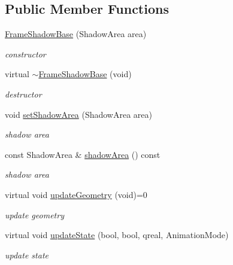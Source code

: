 \subsection*{Public Member Functions}
\begin{DoxyCompactItemize}
\item 
\mbox{\label{class_frame_shadow_base_a27aa9c8e78fe7c11d8f6f8f17751db71}} 
\hyperlink{class_frame_shadow_base_a27aa9c8e78fe7c11d8f6f8f17751db71}{Frame\+Shadow\+Base} (Shadow\+Area area)
\begin{DoxyCompactList}\small\item\em constructor \end{DoxyCompactList}\item 
\mbox{\label{class_frame_shadow_base_a8cf07c9c5d2dbc17e8bc71089f1e3518}} 
virtual \hyperlink{class_frame_shadow_base_a8cf07c9c5d2dbc17e8bc71089f1e3518}{$\sim$\+Frame\+Shadow\+Base} (void)
\begin{DoxyCompactList}\small\item\em destructor \end{DoxyCompactList}\item 
\mbox{\label{class_frame_shadow_base_a05c07a6d4f3df1a76b774fce74adc9ad}} 
void \hyperlink{class_frame_shadow_base_a05c07a6d4f3df1a76b774fce74adc9ad}{set\+Shadow\+Area} (Shadow\+Area area)
\begin{DoxyCompactList}\small\item\em shadow area \end{DoxyCompactList}\item 
\mbox{\label{class_frame_shadow_base_acad6e24bc6d17fdd5020be113c61d1b8}} 
const Shadow\+Area \& \hyperlink{class_frame_shadow_base_acad6e24bc6d17fdd5020be113c61d1b8}{shadow\+Area} () const
\begin{DoxyCompactList}\small\item\em shadow area \end{DoxyCompactList}\item 
\mbox{\label{class_frame_shadow_base_adae0b9ae66770fd7ef6a1d79dc1537a9}} 
virtual void \hyperlink{class_frame_shadow_base_adae0b9ae66770fd7ef6a1d79dc1537a9}{update\+Geometry} (void)=0
\begin{DoxyCompactList}\small\item\em update geometry \end{DoxyCompactList}\item 
\mbox{\label{class_frame_shadow_base_a7ef50fc116a35cf66cae7aa36939d245}} 
virtual void \hyperlink{class_frame_shadow_base_a7ef50fc116a35cf66cae7aa36939d245}{update\+State} (bool, bool, qreal, Animation\+Mode)
\begin{DoxyCompactList}\small\item\em update state \end{DoxyCompactList}\end{DoxyCompactItemize}
